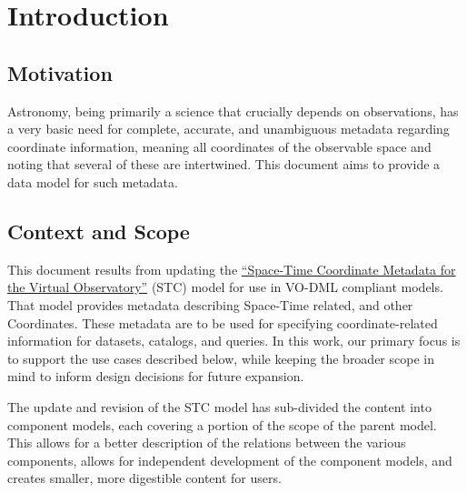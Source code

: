 \documentclass[11pt,a4paper]{ivoa}
\begin{document}
\section{Introduction}

\subsection{Motivation}
Astronomy, being primarily a science that crucially depends on observations, has a very basic 
need for complete, accurate, and unambiguous metadata regarding coordinate information, meaning 
all coordinates of the observable space and noting that several of these are intertwined. This 
document aims to provide a data model for such metadata.

\subsection{Context and Scope}
This document results from updating the \href{http://www.ivoa.net/documents/latest/STC.html}{``Space-Time Coordinate Metadata for the Virtual Observatory''} (STC) \citep{2007ivoa.spec.1030R} model for use in VO-DML compliant models. That model provides metadata describing Space-Time related, and other Coordinates. These metadata are to be used for specifying coordinate-related information for datasets, catalogs, and queries.  In this work, our primary focus is to support the use cases described below, while keeping the broader scope in mind to inform design decisions for future expansion.

The update and revision of the STC model has sub-divided the content into component models, each covering a portion of the scope of the parent model.  This allows for a better description of the relations between the various components, allows for independent development of the component models, and creates smaller, more digestible content for users.
\end{document}
